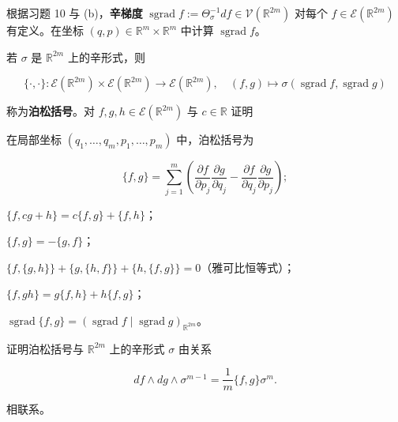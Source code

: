\begin{exercises}
\begin{items}
根据习题 10 与 (b)，\textbf{辛梯度} $ \operatorname{sgrad} f := \Theta_\sigma^{-1} df \in \mathcal{V}(\mathbb{R}^{2m}) $ 对每个 $ f \in \mathcal{E}(\mathbb{R}^{2m}) $ 有定义。在坐标 $ (q, p) \in \mathbb{R}^m \times \mathbb{R}^m $ 中计算 $ \operatorname{sgrad} f $。

\end{items}

\item

若 $ \sigma $ 是 $ \mathbb{R}^{2m} $ 上的辛形式，则

\[
\{\cdot, \cdot\} : \mathcal{E}(\mathbb{R}^{2m}) \times \mathcal{E}(\mathbb{R}^{2m}) \to \mathcal{E}(\mathbb{R}^{2m}), \quad (f, g) \mapsto \sigma(\operatorname{sgrad} f, \operatorname{sgrad} g)
\]

称为\textbf{泊松括号}。对 $ f, g, h \in \mathcal{E}(\mathbb{R}^{2m}) $ 与 $ c \in \mathbb{R} $ 证明

\begin{subitems}
\item

在局部坐标 $ (q_1, \ldots, q_m, p_1, \ldots, p_m) $ 中，泊松括号为

\[
\{f, g\} = \sum_{j=1}^{m} \left( \frac{\partial f}{\partial p_j} \frac{\partial g}{\partial q_j} - \frac{\partial f}{\partial q_j} \frac{\partial g}{\partial p_j} \right);
\]
\item

$ \{f, cg + h\} = c\{f, g\} + \{f, h\} $；

\item

$ \{f, g\} = -\{g, f\} $；

\item

$ \{f, \{g, h\}\} + \{g, \{h, f\}\} + \{h, \{f, g\}\} = 0 $（雅可比恒等式）；

\item

$ \{f, gh\} = g\{f, h\} + h\{f, g\} $；

\item

$ \operatorname{sgrad}\{f, g\} = (\operatorname{sgrad} f \mid \operatorname{sgrad} g)_{\mathbb{R}^{2m}} $。

\end{subitems}

\item

证明泊松括号与 $ \mathbb{R}^{2m} $ 上的辛形式 $ \sigma $ 由关系

\[
df \wedge dg \wedge \sigma^{m-1} = \frac{1}{m} \{f, g\}\sigma^m .
\]

相联系。

\end{exercises}


